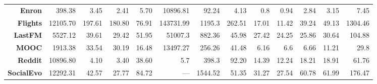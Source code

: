 {\begin{tabular}{@{}r|rrrrrrr|rrrrr@{}}
\textbf{Enron}                        & 398.38                            & 3.45                               & 2.41                               & 5.70                             & 10896.81                            & 92.24                             & 4.13                              & 0.8                             & 0.94                            & 2.84                            & 3.15                            & 7.45                                     \\
\textbf{Flights}                      & 12105.70                          & 197.61                             & 180.80                             & 76.91                            & 143731.99                           & 1195.3                            & 262.51                            & 17.01                           & 11.42                           & 39.24                           & 49.13                           & 1304.46                                  \\
\textbf{LastFM}                       & 5527.12                           & 39.61                              & 29.42                              & 51.95                            & 51007.3                             & 882.36                            & 45.98                             & 27.42                           & 24.25                           & 25.86                           & 30.64                           & 104.88                                   \\
\textbf{MOOC}                         & 1913.38                           & 33.54                              & 30.19                              & 16.48                            & 13497.27                            & 256.26                            & 41.48                             & 6.16                            & 6.6                             & 6.66                            & 11.21                           & 29.8                                     \\
\textbf{Reddit}                       & 10896.80                          & 4.10                               & 3.40                               & 38.60                            & 5.7                                 & 398.3                             & 92.20                             & 14.39                           & 12.24                           & 18.21                           & 18.91                           & 61.76                                    \\
\textbf{SocialEvo}                    & 12292.31                          & 42.57                              & 27.77                              & 84.72                            & ---                                 & 1544.52                           & 51.35                             & 31.27                           & 27.54                           & 60.78                           & 61.99                           & 176.47                                   \\

\end{tabular}}
